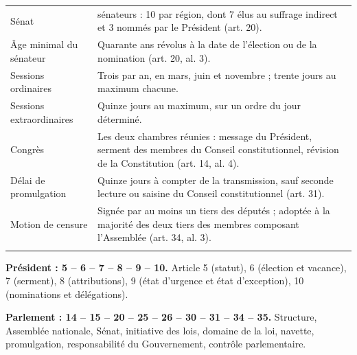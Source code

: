 \documentclass[11pt,a4paper,oneside]{report}
\begin{document}
\begin{longtable}{>{\raggedright\arraybackslash}p{} >{\raggedright\arraybackslash}p{}}
\addlinespace[1pt]
Sénat & 100 sénateurs : 10 par région, dont 7 élus au suffrage indirect et 3 nommés par le Président (art. 20). \\
\addlinespace[1pt]
Âge minimal du sénateur & Quarante ans révolus à la date de l'élection ou de la nomination (art. 20, al. 3). \\
\addlinespace[1pt]
Sessions ordinaires & Trois par an, en mars, juin et novembre ; trente jours au maximum chacune. \\
\addlinespace[1pt]
Sessions extraordinaires & Quinze jours au maximum, sur un ordre du jour déterminé. \\
\addlinespace[1pt]
Congrès & Les deux chambres réunies : message du Président, serment des membres du Conseil constitutionnel, révision de la Constitution (art. 14, al. 4). \\
\addlinespace[1pt]
Délai de promulgation & Quinze jours à compter de la transmission, sauf seconde lecture ou saisine du Conseil constitutionnel (art. 31). \\
\addlinespace[1pt]
Motion de censure & Signée par au moins un tiers des députés ; adoptée à la majorité des deux tiers des membres composant l'Assemblée (art. 34, al. 3). \\
\addlinespace[1pt]
\bottomrule
\end{longtable}
\begin{keybox}[title={À retenir — Deux formules-mémoire}]
\textbf{Président : 5 – 6 – 7 – 8 – 9 – 10.} Article 5 (statut), 6 (élection et vacance), 7 (serment), 8 (attributions), 9 (état d'urgence et état d'exception), 10 (nominations et délégations).

\textbf{Parlement : 14 – 15 – 20 – 25 – 26 – 30 – 31 – 34 – 35.} Structure, Assemblée nationale, Sénat, initiative des lois, domaine de la loi, navette, promulgation, responsabilité du Gouvernement, contrôle parlementaire.
\end{keybox}
\end{document}
